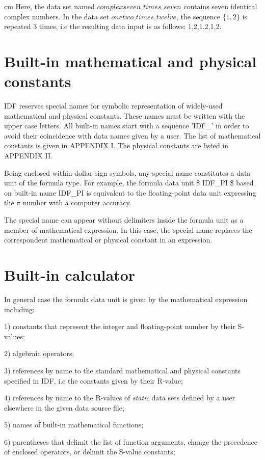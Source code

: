{
{ cm} Here,
the data set named $complexseven\_times\_seven$
contains seven identical complex numbers.
In the data set $onetwo\_times\_twelve$, the sequence $\{1,2\}$
is repeated 3 times, i.e the resulting data input is as follows:
1,2,1,2,1,2.
}

\section{Built-in mathematical and physical constants}

IDF reserves special names for symbolic representation
of  widely-used mathematical and physical constants. 
These names must be written with the upper case letters.
All built-in names start with a sequence 'IDF\_' in order to avoid
their coincidence with  data names given by a user.
The list of mathematical constants is given in APPENDIX I.
The physical constants are listed in APPENDIX II.

Being enclosed within dollar sign symbols, any special name
constitutes a data unit of the formula type.
For example, the formula data unit \$ IDF\_PI \$ based on
built-in name IDF\_PI is equivalent to the
floating-point data unit expressing the $\pi$ number with a computer accuracy.
 
The special name can appear without delimiters inside the formula unit as
a member of mathematical expression. In this case, the special name
replaces the correspondent mathematical or physical constant
in an expression.

\section{Built-in calculator}

In general case the formula data unit is given by 
the mathematical expression including:

1) constants that represent the integer and floating-point number
by their S-values;

2) algebraic operators;

3) references by name to the standard mathematical and physical
constants specified in IDF, i.e the constants given by their R-value;

4) references by name to the R-values of {\it static} data sets defined
by a user elsewhere in the given data source file;

5) names of built-in mathematical functions;

6) parentheses that delimit the list of function arguments,
change the precedence of enclosed operators, or
delimit the S-value constants;

